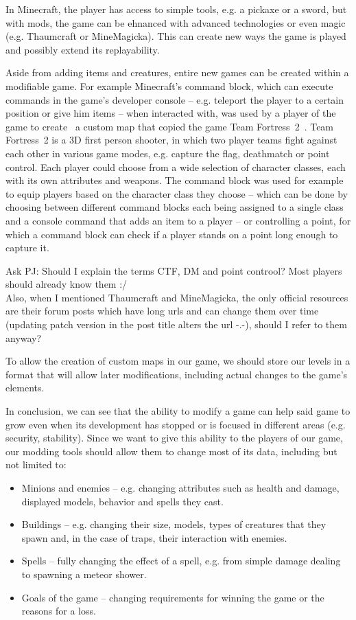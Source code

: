 In Minecraft, the player has access to simple tools, e.g. a pickaxe or a sword, but with mods, the game can be ehnanced with advanced 
technologies or even magic (e.g. Thaumcraft or MineMagicka). This can create new ways the game is played and possibly extend its
replayability.

Aside from adding items and creatures, entire new games can be created within a modifiable game. For example Minecraft's command block,
which can execute commands in the game's developer console -- e.g. teleport the player to a certain position or give him items --
when interacted with, was used by a player of the game to create~\cite{FutureOfMinecraft} a custom map that copied the game 
Team Fortress~2~\cite{TF2}. Team Fortress~2 is a 3D first person shooter, in which two player teams fight against each other in various
game modes, e.g. capture the flag, deathmatch or point control. Each player could choose from a wide selection of character classes, 
each with its
own attributes and weapons. The command block was used for example to equip players based on the character class they choose -- 
which can be done by choosing between different command blocks each being assigned to a single class and a console command that 
adds an item to a player -- or controlling a point, for which a command block can check if a player stands on a point long enough
to capture it.

\bigskip
Ask PJ: Should I explain the terms CTF, DM and point controol? Most players should already know them :/
\\Also, when I mentioned Thaumcraft and MineMagicka, the only official resources are their forum posts which have long urls
and can change them over time (updating patch version in the post title alters the url -.-), should I refer to them anyway?
\bigskip

To allow the creation of custom maps in our game, we should store our levels
in a format that will allow later modifications, including actual changes to the game's elements.

In conclusion, we can see that the ability to modify a game can help said game to grow even when its development has stopped
or is focused in different areas (e.g. security, stability). Since we want to give this ability to the players of
our game, our modding tools should allow them to change most of its data, including but not limited to:

\begin{itemize}
    \item Minions and enemies -- e.g. changing attributes such as health and damage, displayed models, behavior and spells they
        cast.
    \item Buildings -- e.g. changing their size, models, types of creatures that they spawn and, in the case of traps, their interaction with
        enemies.
    \item Spells -- fully changing the effect of a spell, e.g. from simple damage dealing to spawning a meteor shower.
    \item Goals of the game -- changing requirements for winning the game or the reasons for a loss.
\end{itemize}

